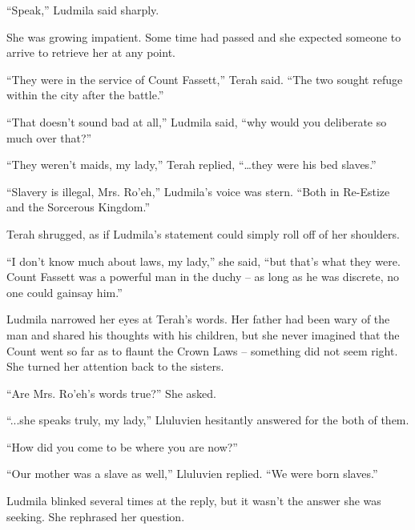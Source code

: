  

“Speak,” Ludmila said sharply.

 

She was growing impatient. Some time had passed and she expected someone to arrive to retrieve her at any point.

 

“They were in the service of Count Fassett,” Terah said. “The two sought refuge within the city after the battle.”

 

“That doesn’t sound bad at all,” Ludmila said, “why would you deliberate so much over that?”

 

“They weren’t maids, my lady,” Terah replied, “…they were his bed slaves.”

 

“Slavery is illegal, Mrs. Ro’eh,” Ludmila’s voice was stern. “Both in Re-Estize and the Sorcerous Kingdom.”

 

Terah shrugged, as if Ludmila’s statement could simply roll off of her shoulders.

 

“I don’t know much about laws, my lady,” she said, “but that’s what they were. Count Fassett was a powerful man in the duchy – as long as he was discrete, no one could gainsay him.”

 

Ludmila narrowed her eyes at Terah’s words. Her father had been wary of the man and shared his thoughts with his children, but she never imagined that the Count went so far as to flaunt the Crown Laws – something did not seem right. She turned her attention back to the sisters.

 

“Are Mrs. Ro’eh’s words true?” She asked.

 

“...she speaks truly, my lady,” Lluluvien hesitantly answered for the both of them.

 

“How did you come to be where you are now?”

 

“Our mother was a slave as well,” Lluluvien replied. “We were born slaves.”

 

Ludmila blinked several times at the reply, but it wasn’t the answer she was seeking. She rephrased her question.

